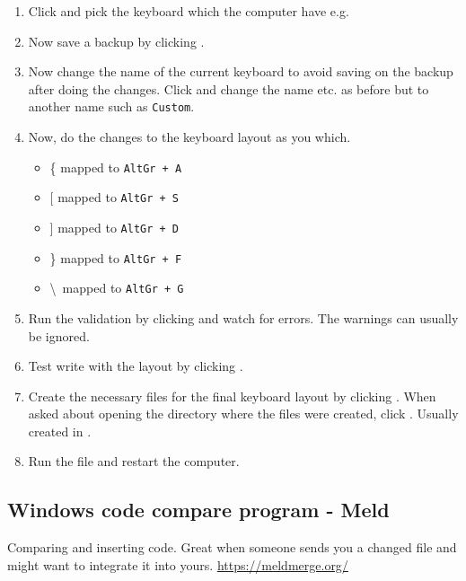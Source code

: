 \begin{enumerate}
    \item Click  and pick the keyboard which the computer have e.g. 
    
    \item Now save a backup by clicking .
    
    \item Now change the name of the current keyboard to avoid saving on the backup after doing the changes. Click  and change the name etc. as before but to another name such as \texttt{Custom}.
    
    \item Now, do the changes to the keyboard layout as you which.
    \begin{itemize}
        \item \{ mapped to \texttt{AltGr + A}
        
        \item {[} mapped to \texttt{AltGr + S}
        
        \item {]} mapped to \texttt{AltGr + D}
        
        \item \} mapped to \texttt{AltGr + F}
        
        \item \textbackslash\ mapped to \texttt{AltGr + G}
    \end{itemize}
    
    \item Run the validation by clicking  and watch for errors. The warnings can usually be ignored.
    
    \item Test write with the layout by clicking .
    
    \item Create the necessary files for the final keyboard layout by clicking . When asked about opening the directory where the files were created, click . Usually created in .
    
    \item Run the  file and restart the computer.
\end{enumerate}

\subsection{Windows code compare program - Meld}
Comparing and inserting code. Great when someone sends you a changed file and might want to integrate it into yours.
\url{https://meldmerge.org/}